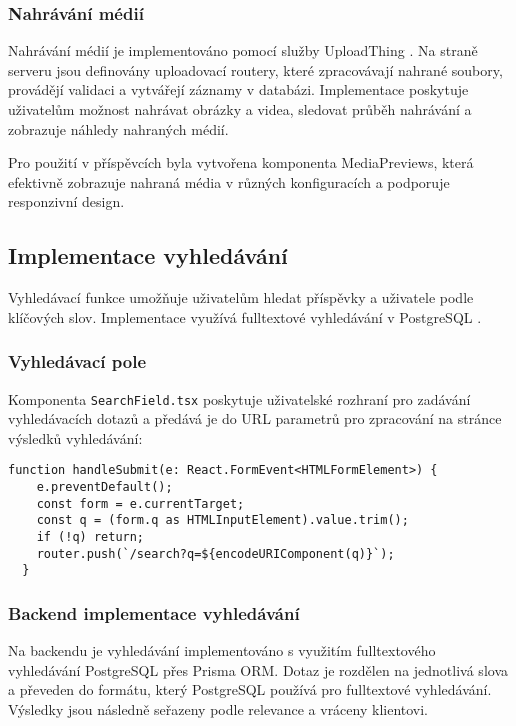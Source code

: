 \documentclass[12pt]{article}
\begin{document}
\subsubsection{Nahrávání médií}

Nahrávání médií je implementováno pomocí služby UploadThing \citep{UploadThing}. Na straně serveru jsou definovány uploadovací routery, které zpracovávají nahrané soubory, provádějí validaci a vytvářejí záznamy v databázi. Implementace poskytuje uživatelům možnost nahrávat obrázky a videa, sledovat průběh nahrávání a zobrazuje náhledy nahraných médií.

Pro použití v příspěvcích byla vytvořena komponenta MediaPreviews, která efektivně zobrazuje nahraná média v různých konfiguracích a podporuje responzivní design.

\subsection{Implementace vyhledávání}

Vyhledávací funkce umožňuje uživatelům hledat příspěvky a uživatele podle klíčových slov. Implementace využívá fulltextové vyhledávání v PostgreSQL \citep{PostgreSQL2023FTS}.

\subsubsection{Vyhledávací pole}

Komponenta \texttt{SearchField.tsx} poskytuje uživatelské rozhraní pro zadávání vyhledávacích dotazů a předává je do URL parametrů pro zpracování na stránce výsledků vyhledávání:

\begin{lstlisting}[style=typescript]
  function handleSubmit(e: React.FormEvent<HTMLFormElement>) {
    e.preventDefault();
    const form = e.currentTarget;
    const q = (form.q as HTMLInputElement).value.trim();
    if (!q) return;
    router.push(`/search?q=${encodeURIComponent(q)}`);
  }
\end{lstlisting}

\subsubsection{Backend implementace vyhledávání}

Na backendu je vyhledávání implementováno s využitím fulltextového vyhledávání PostgreSQL přes Prisma ORM. Dotaz je rozdělen na jednotlivá slova a převeden do formátu, který PostgreSQL používá pro fulltextové vyhledávání. Výsledky jsou následně seřazeny podle relevance a vráceny klientovi.
\end{document}
